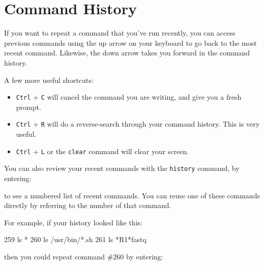 \documentclass[
  letterpaper,
  DIV=11,
  numbers=noendperiod]{scrreprt}
\newenvironment{Shaded}{\begin{snugshade}}{\end{snugshade}}
\newcommand{\ExtensionTok}[1]{\textcolor[rgb]{0.00,0.23,0.31}{#1}}
\newcommand{\NormalTok}[1]{\textcolor[rgb]{0.00,0.23,0.31}{#1}}
\newcommand{\PreprocessorTok}[1]{\textcolor[rgb]{0.68,0.00,0.00}{#1}}
\begin{document}
\section{Command History}\label{command-history}

If you want to repeat a command that you've run recently, you can access
previous commands using the up arrow on your keyboard to go back to the
most recent command. Likewise, the down arrow takes you forward in the
command history.

A few more useful shortcuts:

\begin{itemize}
\item
  \texttt{Ctrl} + \texttt{C} will cancel the command you are writing,
  and give you a fresh prompt.
\item
  \texttt{Ctrl} + \texttt{R} will do a reverse-search through your
  command history. This is very useful.
\item
  \texttt{Ctrl} + \texttt{L} or the \texttt{clear} command will clear
  your screen.
\end{itemize}

You can also review your recent commands with the \texttt{history}
command, by entering:

\begin{Shaded}
\end{Shaded}

to see a numbered list of recent commands. You can reuse one of these
commands directly by referring to the number of that command.

For example, if your history looked like this:

\begin{Shaded}
\begin{Highlighting}[]
\ExtensionTok{259}\NormalTok{  ls }\PreprocessorTok{*}
\ExtensionTok{260}\NormalTok{  ls /usr/bin/}\PreprocessorTok{*}\NormalTok{.sh}
\ExtensionTok{261}\NormalTok{  ls }\PreprocessorTok{*}\NormalTok{R1}\PreprocessorTok{*}\NormalTok{fastq}
\end{Highlighting}
\end{Shaded}

then you could repeat command \#260 by entering:

\begin{Shaded}
\end{Shaded}
\end{document}
